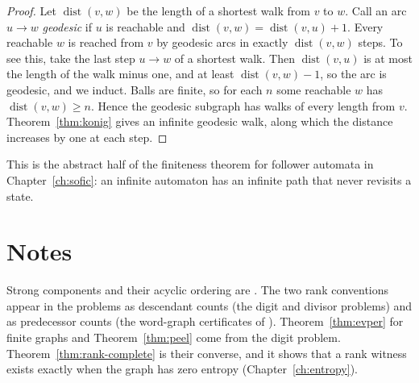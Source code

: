 \begin{proof}
Let \(\operatorname{dist}(v,w)\) be the length of a shortest walk from \(v\) to \(w\). Call an
arc \(u\to w\) \emph{geodesic} if \(u\) is reachable and
\(\operatorname{dist}(v,w)=\operatorname{dist}(v,u)+1\). Every reachable \(w\) is reached from
\(v\) by geodesic arcs in exactly \(\operatorname{dist}(v,w)\) steps. To see this, take the last
step \(u\to w\) of a shortest walk. Then \(\operatorname{dist}(v,u)\) is at most the length of
the walk minus one, and at least \(\operatorname{dist}(v,w)-1\), so the arc is geodesic, and we
induct. Balls are finite, so for each \(n\) some reachable \(w\) has
\(\operatorname{dist}(v,w)\ge n\). Hence the geodesic subgraph has walks of every length from
\(v\). Theorem~\ref{thm:konig} gives an infinite geodesic walk, along which the distance
increases by one at each step.
\end{proof}

This is the abstract half of the finiteness theorem for follower automata in
Chapter~\ref{ch:sofic}: an infinite automaton has an infinite path that never revisits a state.

\section*{Notes}
Strong components and their acyclic ordering are \cite[§1.5]{BJG09}. The two rank conventions
appear in the problems as descendant counts (the digit and divisor problems) and as predecessor
counts (the word-graph certificates of \cite{Oda26}). Theorem~\ref{thm:evper} for finite graphs
and Theorem~\ref{thm:peel} come from the digit problem. Theorem~\ref{thm:rank-complete} is
their converse, and it shows that a rank witness exists exactly when the graph has zero entropy
(Chapter~\ref{ch:entropy}).

